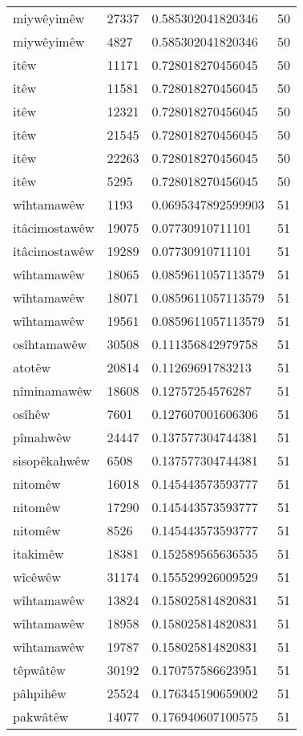 \begin{longtable}{llll}
miywêyimêw & 27337 & 0.585302041820346 & 50\\
miywêyimêw & 4827 & 0.585302041820346 & 50\\
itêw & 11171 & 0.728018270456045 & 50\\
itêw & 11581 & 0.728018270456045 & 50\\
itêw & 12321 & 0.728018270456045 & 50\\
itêw & 21545 & 0.728018270456045 & 50\\
itêw & 22263 & 0.728018270456045 & 50\\
itêw & 5295 & 0.728018270456045 & 50\\
wîhtamawêw & 1193 & 0.0695347892599903 & 51\\
itâcimostawêw & 19075 & 0.07730910711101 & 51\\
itâcimostawêw & 19289 & 0.07730910711101 & 51\\
wîhtamawêw & 18065 & 0.0859611057113579 & 51\\
wîhtamawêw & 18071 & 0.0859611057113579 & 51\\
wîhtamawêw & 19561 & 0.0859611057113579 & 51\\
osîhtamawêw & 30508 & 0.111356842979758 & 51\\
atotêw & 20814 & 0.11269691783213 & 51\\
nîminamawêw & 18608 & 0.12757254576287 & 51\\
osîhêw & 7601 & 0.127607001606306 & 51\\
pîmahwêw & 24447 & 0.137577304744381 & 51\\
sisopêkahwêw & 6508 & 0.137577304744381 & 51\\
nitomêw & 16018 & 0.145443573593777 & 51\\
nitomêw & 17290 & 0.145443573593777 & 51\\
nitomêw & 8526 & 0.145443573593777 & 51\\
itakimêw & 18381 & 0.152589565636535 & 51\\
wîcêwêw & 31174 & 0.155529926009529 & 51\\
wîhtamawêw & 13824 & 0.158025814820831 & 51\\
wîhtamawêw & 18958 & 0.158025814820831 & 51\\
wîhtamawêw & 19787 & 0.158025814820831 & 51\\
têpwâtêw & 30192 & 0.170757586623951 & 51\\
pâhpihêw & 25524 & 0.176345190659002 & 51\\
pakwâtêw & 14077 & 0.176940607100575 & 51\\

\end{longtable}
